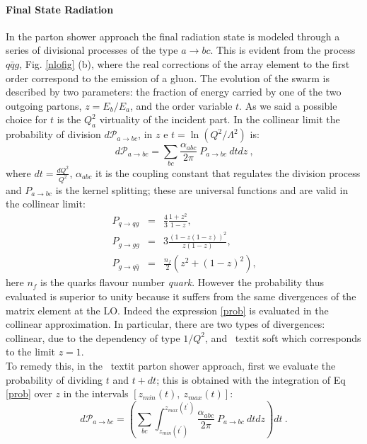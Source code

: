 \paragraph{Final State Radiation}
In the parton shower approach the final radiation state is modeled through a series of divisional processes of the type $ a \rightarrow bc $.   
This is evident from the process$q \bar{q}g$, Fig. \ref{nlofig} (b), where the real corrections of the array element to the first order correspond to the emission of a gluon. The evolution of the swarm is described by two parameters: the fraction of energy carried by one of the two outgoing partons, $ z = E_b / E_a $, and the order variable $ t $. As we said a possible choice for $ t $ is the $ Q_a^2 $ virtuality of the incident part.
In the  collinear limit the probability of division $d \mathcal{P}_{a \rightarrow bc}$, in  $z$ e $t=\ln(Q^2/\Lambda^2)$ is:
\begin{equation}
 d \mathcal{P}_{a \rightarrow bc}= \sum_{bc} \frac{\alpha_{abc}}{2 \pi}\: {P}_{a \rightarrow bc} \:dt dz  \: \mbox{,} \label{prob}  \end{equation}
where $dt=\frac{d Q^2}{Q^2}$, $\alpha_{abc}$ it is the coupling constant that regulates the division process and  ${P}_{a \rightarrow bc}$ is the kernel splitting; these are universal functions and are valid in the collinear limit:
\begin{eqnarray}
P_{q \rightarrow qg    }&=& \frac{4}{3} \frac{1+z^2}{1-z} \mbox{,} \nonumber \\ 
 P_{g \rightarrow gg }&=& 3 \frac{(1-z(1-z))^2}{z(1-z)}    \mbox{,} \\ 
P_{g \rightarrow q\bar{q} }&=& \frac{n_f}{2} (z^2+ (1-z)^2)   \mbox{,} \nonumber \end{eqnarray}
here $n_f$ is the quarks flavour number \textit{quark}.
However the probability thus evaluated is superior to unity because it suffers from the same divergences of the matrix element at the LO. 
Indeed the expression \ref{prob} is evaluated in the collinear approximation. 
In particular, there are two types of divergences: collinear, due to the dependency of type $ 1 / Q^2 $, and \ textit {soft} which corresponds to the limit $ z = 1 $. \\
To remedy this, in the \ textit {parton shower} approach, first we evaluate the probability of dividing $ t $ and $ t + dt $; this is obtained 	with the integration of Eq \ref{prob} over  $z$ in the intervals  $[z_{min}(t), \: z_{max}(t)]$:
\begin{equation}
 d \mathcal{P}_{a \rightarrow bc}= \left( \sum_{bc} \int_{z_{min}(t^{'})}^{{z_{max}(t^{'})}}  \frac{\alpha_{abc}}{2 \pi}\: {P}_{a \rightarrow bc} \:dt dz \right) dt  \: \mbox{.}   \end{equation}
